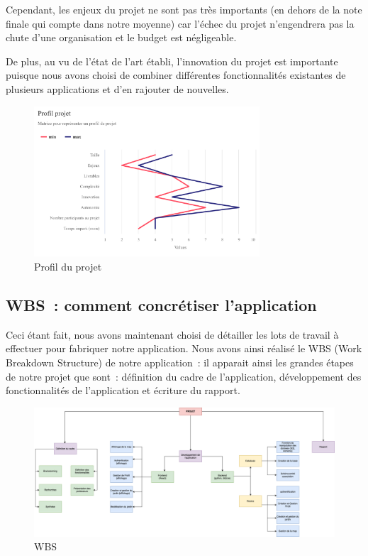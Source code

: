 \documentclass[french,a4paper]{article}
\begin{document}
Cependant, les enjeux du projet ne sont pas très importants (en dehors de la note finale qui compte dans notre moyenne) car l'échec du projet n'engendrera pas la chute d'une organisation et le budget est négligeable.

De plus, au vu de l’état de l’art établi, l’innovation du projet est importante puisque nous avons choisi de combiner différentes fonctionnalités existantes de plusieurs applications et d’en rajouter de nouvelles.

\begin{figure}[H]
    \centering
    \includegraphics[width=0.75\textwidth]{img/profil_projet.png}
    \caption{Profil du projet}
\end{figure}

\subsection{WBS~: comment concrétiser l’application}
Ceci étant fait, nous avons maintenant choisi de détailler les lots de travail à effectuer pour fabriquer notre application. Nous avons ainsi réalisé le WBS (Work Breakdown Structure) de notre application~: il apparait ainsi les grandes étapes de notre projet que sont~: définition du cadre de l’application, développement des fonctionnalités de l’application et écriture du rapport.
\begin{figure}[H]
    \centering
    \includegraphics[width=1\textwidth]{img/WBS.png}
    \caption{WBS}
\end{figure}
\end{document}
